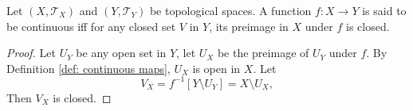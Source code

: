 \begin{proposition}
	Let $(X, \mathcal T_X)$ and $(Y, \mathcal T_Y)$ be topological spaces. A function $f: X \to Y$ is said to be continuous iff for any closed set $V$ in $Y$, its preimage in $X$ under $f$ is closed.
	
	\begin{proof}
		Let $U_Y$ be any open set in $Y$, let $U_X$ be the preimage of $U_Y$ under $f$. By Definition \ref{def: continuous maps}, $U_X$ is open in $X$. Let
		$$
		V_X = f^{-1}[Y \setminus U_Y] = X \setminus U_X,
		$$
		Then $V_X$ is closed.
	\end{proof}
\end{proposition}
